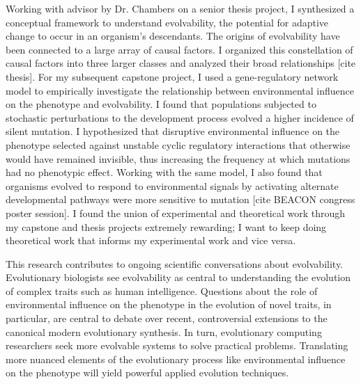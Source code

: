 Working with advisor by Dr. Chambers on a senior thesis project, I synthesized a conceptual framework to understand evolvability, the potential for adaptive change to occur in an organism's descendants.
The origins of evolvability have been connected to a large array of causal factors.
I organized this constellation of causal factors into three larger classes and analyzed their broad relationships [cite thesis].
For my subsequent capstone project, I used a gene-regulatory network model to empirically investigate the relationship between environmental influence on the phenotype and evolvability.
I found that populations subjected to stochastic perturbations to the development process evolved a higher incidence of silent mutation.
I hypothesized that disruptive environmental influence on the phenotype selected against unstable cyclic regulatory interactions that otherwise would have remained invisible, thus increasing the frequency at which mutations had no phenotypic effect.
Working with the same model, I also found that organisms evolved to respond to environmental signals by activating alternate developmental pathways were more sensitive to mutation [cite BEACON congress poster session].
I found the union of experimental and theoretical work through my capstone and thesis projects extremely rewarding;
I want to keep doing theoretical work that informs my experimental work and vice versa.

This research contributes to ongoing scientific conversations about evolvability.
Evolutionary biologists see evolvability as central to understanding the evolution of complex traits such as human intelligence.
Questions about the role of environmental influence on the phenotype in the evolution of novel traits, in particular, are central to debate over recent, controversial extensions to the canonical modern evolutionary synthesis.
In turn, evolutionary computing researchers seek more evolvable systems to solve practical problems.
Translating more nuanced elements of the evolutionary process like environmental influence on the phenotype will yield powerful applied evolution techniques.
